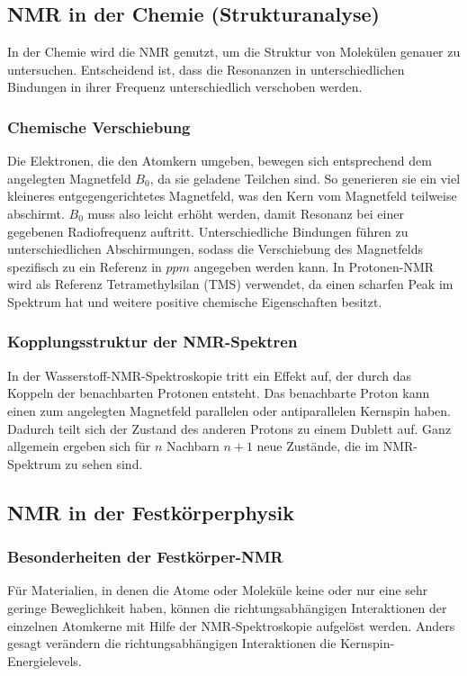 \subsection{NMR in der Chemie (Strukturanalyse)}
In der Chemie wird die NMR genutzt, um die Struktur von Molekülen genauer zu untersuchen. Entscheidend ist, dass die Resonanzen in unterschiedlichen Bindungen in ihrer Frequenz unterschiedlich verschoben werden.
\subsubsection*{Chemische Verschiebung}
Die Elektronen, die den Atomkern umgeben, bewegen sich entsprechend dem angelegten Magnetfeld $B_0$, da sie geladene Teilchen sind. So generieren sie ein viel kleineres entgegengerichtetes Magnetfeld, was den Kern vom Magnetfeld teilweise abschirmt. $B_0$ muss also leicht erhöht werden, damit Resonanz bei einer gegebenen Radiofrequenz auftritt. Unterschiedliche Bindungen führen zu unterschiedlichen Abschirmungen, sodass die Verschiebung des Magnetfelds spezifisch zu ein Referenz in $ppm$ angegeben werden kann. In Protonen-NMR wird als Referenz Tetramethylsilan (TMS) verwendet, da einen scharfen Peak im Spektrum hat und weitere positive chemische Eigenschaften besitzt.
\subsubsection*{Kopplungsstruktur der NMR-Spektren}
In der Wasserstoff-NMR-Spektroskopie tritt ein Effekt auf, der durch das Koppeln der benachbarten Protonen entsteht. Das benachbarte Proton kann einen zum angelegten Magnetfeld parallelen oder antiparallelen Kernspin haben. Dadurch teilt sich der Zustand des anderen Protons zu einem Dublett auf. Ganz allgemein ergeben sich für $n$ Nachbarn $ n + 1$ neue Zustände, die im NMR-Spektrum zu sehen sind.

\subsection{NMR in der Festkörperphysik}
\subsubsection*{Besonderheiten der Festkörper-NMR}
Für Materialien, in denen die Atome oder Moleküle keine oder nur eine sehr geringe Beweglichkeit haben, können die richtungsabhängigen Interaktionen der einzelnen Atomkerne mit Hilfe der NMR-Spektroskopie aufgelöst werden. Anders gesagt verändern die richtungsabhängigen Interaktionen die Kernspin-Energielevels.
